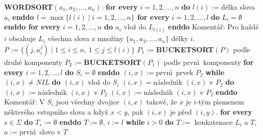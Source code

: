 {\bf WORDSORT$(a_1,a_2,\dots,a_n)$}:\newline 
{\bf for every} $i=1,2,\dots,n$ {\bf do} $l(i):=$d\'elka slova $a_
i$ {\bf enddo\newline 
$l=\max\{l(i)\mid i=1,2,\dots,n\}$\newline 
for every} $i=1,2,\dots,l$ {\bf do} $L_i=\emptyset$ {\bf enddo\newline 
for every} $i=1,2,\dots,n$ {\bf do\newline 
\phantom{{\rm---}}$a_i$} vlo\v z do $L_{l(i)}$\newline 
{\bf enddo\newline}
Koment\'a\v r: Pro ka\v zd\'e $i$ obsahuje $L_i$ v\v sechna slova z mno\v ziny 
$\{a_1,a_2,\dots,a_n\}$ d\'elky $i$.\newline 
$P_{}:=\{(j,a_i^j)\mid 1\le i\le n,\,1\le j\le l(i)\}$\newline 
$P_1:=${\bf BUCKETSORT$(P)$} podle druh\'e komponenty\newline 
$P_2:=${\bf BUCKETSORT$(P_1)$} podle prvn\'\i\ komponenty\newline 
{\bf for every} $i=1,2,\dots,l$ {\bf do} $S_i=\emptyset$ {\bf enddo\newline 
$(i,x):=$}prvn\'\i\ prvek $P_2$\newline 
{\bf while} $(i,x)\ne NIL$ {\bf do\newline 
\phantom{{\rm---}}$(i,x)$} vlo\v z do $S_i$\newline 
\phantom{---}{\bf while}$(i,x)=$n\'asledn\'\i k $(i,x)$ v $P_2$ {\bf do}\newline
\phantom{{\rm------}}$(i,x):=$n\'asledn\'\i k $(i,x)$ v $P_2$\newline 
{}\newline
\phantom{---}$(i,x):=$n\'asledn\'\i k $(i,x)$ v $P_2$\newline 
{\bf enddo}\newline
Koment\'a\v r: V $S_i$ jsou v\v sechny dvojice $(i,x)$ takov\'e, \v ze $
x$ 
je $i$-t\'ym p\'\i smenem n\v ekter\'eho vstupn\'\i ho slova a kdy\v z $
x<y$, pak 
$(i,x)$ je p\v red $(i,y)$.\newline 
{\bf for every} $s\in\Sigma$ {\bf do} $T_s:=\emptyset$ {\bf enddo\newline 
$T:=\emptyset$}, $i:=l$\newline 
{\bf while} $i>0$ {\bf do\newline 
\phantom{{\rm---}}$T:=$} konkatenace $L_i$ a $T$, $a:=$prvn\'\i\ slovo v $
T$\newline 
